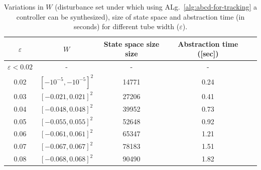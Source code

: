 \begin{table}[h!]
	\centering
	\caption{Variations in $W$ (disturbance set under which using ALg.~\ref{alg:abcd-for-tracking} a controller can be synthesized), size of state space and abstraction time (in seconds) for different tube width ($\varepsilon$).}
	\vspace{1mm}
	\begin{tabular}{|c|c|c|c|c|}
		\hline
		$\varepsilon$ &  $W$  & State space size size & Abstraction time ([sec])  \\
		\hline
		$\varepsilon<0.02$  & -    & -  & -  \\
		\hline
		0.02   & $[-10^{-5},-10^{-5}]^2$    & 14771  & 0.24  \\
		\hline
		0.03   & $[-0.021,0.021]^2$   & 27206  & 0.41  \\
		\hline
		0.04    & $[-0.048,0.048]^2$  & 39952  & 0.73  \\
		\hline
		0.05  &  $[-0.055,0.055]^2$   & 52648  & 0.92  \\
		\hline
		0.06    & $[-0.061,0.061]^2$  & 65347  & 1.21  \\
		\hline
		0.07   &$[-0.067,0.067]^2$  & 78183     & 1.51 \\
		\hline
		0.08   &$[-0.068,0.068]^2$  & 90490     & 1.82 \\
		\hline
	\end{tabular}
	\label{tab:inv_pend}
\end{table}

